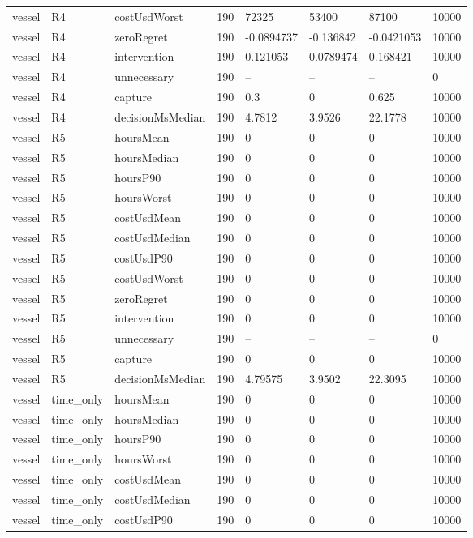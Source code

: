 \begin{tabular}{llllllll}
vessel & R4 & costUsdWorst & 190 & 72325 & 53400 & 87100 & 10000 \\
vessel & R4 & zeroRegret & 190 & -0.0894737 & -0.136842 & -0.0421053 & 10000 \\
vessel & R4 & intervention & 190 & 0.121053 & 0.0789474 & 0.168421 & 10000 \\
vessel & R4 & unnecessary & 190 & -- & -- & -- & 0 \\
vessel & R4 & capture & 190 & 0.3 & 0 & 0.625 & 10000 \\
vessel & R4 & decisionMsMedian & 190 & 4.7812 & 3.9526 & 22.1778 & 10000 \\
vessel & R5 & hoursMean & 190 & 0 & 0 & 0 & 10000 \\
vessel & R5 & hoursMedian & 190 & 0 & 0 & 0 & 10000 \\
vessel & R5 & hoursP90 & 190 & 0 & 0 & 0 & 10000 \\
vessel & R5 & hoursWorst & 190 & 0 & 0 & 0 & 10000 \\
vessel & R5 & costUsdMean & 190 & 0 & 0 & 0 & 10000 \\
vessel & R5 & costUsdMedian & 190 & 0 & 0 & 0 & 10000 \\
vessel & R5 & costUsdP90 & 190 & 0 & 0 & 0 & 10000 \\
vessel & R5 & costUsdWorst & 190 & 0 & 0 & 0 & 10000 \\
vessel & R5 & zeroRegret & 190 & 0 & 0 & 0 & 10000 \\
vessel & R5 & intervention & 190 & 0 & 0 & 0 & 10000 \\
vessel & R5 & unnecessary & 190 & -- & -- & -- & 0 \\
vessel & R5 & capture & 190 & 0 & 0 & 0 & 10000 \\
vessel & R5 & decisionMsMedian & 190 & 4.79575 & 3.9502 & 22.3095 & 10000 \\
vessel & time\_only & hoursMean & 190 & 0 & 0 & 0 & 10000 \\
vessel & time\_only & hoursMedian & 190 & 0 & 0 & 0 & 10000 \\
vessel & time\_only & hoursP90 & 190 & 0 & 0 & 0 & 10000 \\
vessel & time\_only & hoursWorst & 190 & 0 & 0 & 0 & 10000 \\
vessel & time\_only & costUsdMean & 190 & 0 & 0 & 0 & 10000 \\
vessel & time\_only & costUsdMedian & 190 & 0 & 0 & 0 & 10000 \\
vessel & time\_only & costUsdP90 & 190 & 0 & 0 & 0 & 10000 \\

\end{tabular}
